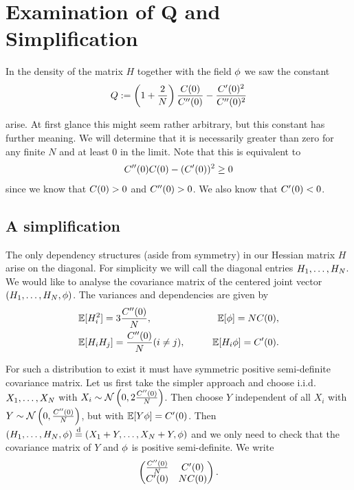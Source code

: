 
\section{Examination of Q and Simplification}

In the density of the matrix $H$ together with the field $\phi$ we saw the constant
\begin{align*}
    Q := \left(1+\frac2{N}\right)
    \frac{C(0)}{C''(0)} - \frac{C'(0)^2}{C''(0)^2}
\end{align*}

arise. At first glance this might seem rather arbitrary, but this constant has further meaning. We will determine that it is necessarily greater than zero for any finite $N$ and at least $0$ in the limit. Note that this is equivalent to 
\begin{align*}
    C''(0)C(0) - (C'(0))^2 \geq 0
\end{align*}
since we know that $C(0) > 0$ and $C''(0) > 0$. We also know that $C'(0)<0$.

\subsection{A simplification}

The only dependency structures (aside from symmetry) in our Hessian matrix $H$ arise on the diagonal. For simplicity we will call the diagonal entries $H_1, \ldots, H_N$. We would like to analyse the covariance matrix of the centered joint vector $(H_1, \ldots, H_N, \phi)$. The variances and dependencies are given by 
\begin{eqnarray*}
    &\mathbb{E}[H_i^2] = 3\frac{C''(0)}{N}, \qquad &\mathbb{E}[\phi] = N C(0), \\
    &\mathbb{E}[H_i H_j] = \frac{C''(0)}{N} (i \neq j), &\qquad \mathbb{E}[H_i \phi] = C'(0).
\end{eqnarray*}

For such a distribution to exist it must have symmetric positive semi-definite covariance matrix. Let us first take the simpler approach and choose i.i.d. $X_1, \ldots, X_N$ with $X_i \sim \mathcal{N}\left(0,2\frac{C''(0)}{N}\right)$. Then choose $Y$ independent of all $X_i$ with $Y \sim \mathcal{N}\left(0,\frac{C''(0)}{N}\right)$, but with $\mathbb{E}[Y \phi] = C'(0)$. Then $(H_1, \ldots, H_N,\phi) \overset{\text{d}}{=} (X_1 + Y, \ldots, X_N + Y,\phi)$ and we only need to check that the covariance matrix of $Y$ and $\phi$ is positive semi-definite. We write
\begin{align*}
    \begin{pmatrix}
        \frac{C''(0)}{N} & C'(0) \\
        C'(0) & N C(0)
    \end{pmatrix}.
\end{align*}

